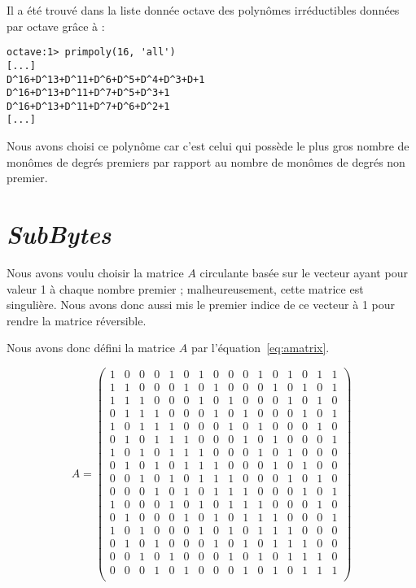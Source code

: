 \documentclass[12pt,a4paper]{report}
\begin{document}
Il a été trouvé dans la liste donnée octave des polynômes irréductibles données par octave
grâce à :

\begin{verbatim}
octave:1> primpoly(16, 'all')
[...]
D^16+D^13+D^11+D^6+D^5+D^4+D^3+D+1
D^16+D^13+D^11+D^7+D^5+D^3+1
D^16+D^13+D^11+D^7+D^6+D^2+1
[...]
\end{verbatim}

Nous avons choisi ce polynôme car c'est celui qui possède le plus gros nombre
de monômes de degrés premiers par rapport au nombre de monômes de degrés non
premier.

\section{\emph{SubBytes}}

Nous avons voulu choisir la matrice $A$ circulante basée sur le vecteur ayant pour
valeur 1 à chaque nombre premier ; malheureusement, cette matrice est singulière.
Nous avons donc aussi mis le premier indice de ce vecteur à 1 pour rendre la matrice
réversible.

Nous avons donc défini la matrice $A$ par l'équation~\ref{eq:amatrix}.

\begin{equation}
\label{eq:amatrix}
A = \left(
\begin{array}{cccccccccccccccc}
1 & 0 & 0 & 0 & 1 & 0 & 1 & 0 & 0 & 0 & 1 & 0 & 1 & 0 & 1 & 1 \\
1 & 1 & 0 & 0 & 0 & 1 & 0 & 1 & 0 & 0 & 0 & 1 & 0 & 1 & 0 & 1 \\
1 & 1 & 1 & 0 & 0 & 0 & 1 & 0 & 1 & 0 & 0 & 0 & 1 & 0 & 1 & 0 \\
0 & 1 & 1 & 1 & 0 & 0 & 0 & 1 & 0 & 1 & 0 & 0 & 0 & 1 & 0 & 1 \\
1 & 0 & 1 & 1 & 1 & 0 & 0 & 0 & 1 & 0 & 1 & 0 & 0 & 0 & 1 & 0 \\
0 & 1 & 0 & 1 & 1 & 1 & 0 & 0 & 0 & 1 & 0 & 1 & 0 & 0 & 0 & 1 \\
1 & 0 & 1 & 0 & 1 & 1 & 1 & 0 & 0 & 0 & 1 & 0 & 1 & 0 & 0 & 0 \\
0 & 1 & 0 & 1 & 0 & 1 & 1 & 1 & 0 & 0 & 0 & 1 & 0 & 1 & 0 & 0 \\
0 & 0 & 1 & 0 & 1 & 0 & 1 & 1 & 1 & 0 & 0 & 0 & 1 & 0 & 1 & 0 \\
0 & 0 & 0 & 1 & 0 & 1 & 0 & 1 & 1 & 1 & 0 & 0 & 0 & 1 & 0 & 1 \\
1 & 0 & 0 & 0 & 1 & 0 & 1 & 0 & 1 & 1 & 1 & 0 & 0 & 0 & 1 & 0 \\
0 & 1 & 0 & 0 & 0 & 1 & 0 & 1 & 0 & 1 & 1 & 1 & 0 & 0 & 0 & 1 \\
1 & 0 & 1 & 0 & 0 & 0 & 1 & 0 & 1 & 0 & 1 & 1 & 1 & 0 & 0 & 0 \\
0 & 1 & 0 & 1 & 0 & 0 & 0 & 1 & 0 & 1 & 0 & 1 & 1 & 1 & 0 & 0 \\
0 & 0 & 1 & 0 & 1 & 0 & 0 & 0 & 1 & 0 & 1 & 0 & 1 & 1 & 1 & 0 \\
0 & 0 & 0 & 1 & 0 & 1 & 0 & 0 & 0 & 1 & 0 & 1 & 0 & 1 & 1 & 1 \\
\end{array}
\right)
\end{equation}
\end{document}
